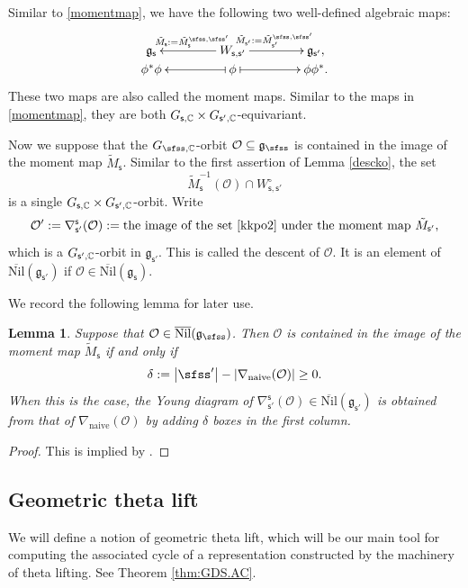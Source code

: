 \documentclass[11pt,a4paper]{amsart}
\def\abs#1{\left|{#1}\right|}
\newcommand{\CO}{{\mathcal {O}}}
\newcommand{\g}{\mathfrak g}
\def\DD{\nabla}
\newcommand{\be}{\begin {equation}}
\newcommand{\ee}{\end {equation}}
\numberwithin{equation}{section}
\newtheorem{lem}[thm]{Lemma}
\theoremstyle{remark}
\def\subset{\subseteq}
\def\Nil{\overline{\mathrm{Nil}}}
\begin{document}
Similar to \eqref{momentmap}, we have the following two well-defined algebraic maps:
   \be\label{momentmap2}
    \xymatrix@R=0em@C=4em{
      \g_\mathsf s &\ar[l]_{\tilde M_\mathsf s:=\tilde M_\mathsf s^{\sfss, \sfss'}} W_{\mathsf s, \mathsf s'}\ar[r]^{\tilde M_{\mathsf s'}:=\tilde M_{\mathsf s'}^{\sfss, \sfss'}}& \g_{\mathsf s'},\\
     \phi^* \phi & \ar@{|->}[l] \phi \ar@{|->}[r] & \phi \phi^*.
    }
  \ee
These two maps are also called the moment maps. Similar to the maps in \eqref{momentmap},   they  are both $G_{\mathsf s,\mathbb{C}}\times G_{\mathsf s', \mathbb{C}}$-equivariant.



Now we suppose that the $G_{\sfss, \C}$-orbit $\CO\subset\g_\sfss$
  is contained in the image of the moment map $\tilde M_{\mathsf s}$. Similar to
the first assertion of Lemma \ref{descko}, the set
\be\label{kkpo2}
  \tilde M_{\mathsf s}^{-1}(\CO)\cap W_{\mathsf s, \mathsf s'}^\circ
\ee
is a single $G_{\mathsf s,\mathbb{C}}\times G_{\mathsf s', \mathbb{C}}$-orbit.
Write
\[
 \CO':= \nabla^{\mathsf s}_{\mathsf s'}(\CO):=\textrm{the image of the set \eqref{kkpo2} under the moment map  $\tilde M_{\mathsf s'}$,}
\]
which is a $ G_{\mathsf s', \mathbb{C}}$-orbit in $\g_{\mathsf s'}$.
This is  called the descent of $\CO$. It is an element of  $\Nil(\g_{\mathsf s'})$ if $\CO\in \Nil(\g_{\mathsf s})$.


We record the following lemma for later use.
\begin{lem}\label{imageofmm}
Suppose that $\CO\in \Nil(\g_\sfss)$. Then  $\CO$ is contained in the image of the moment map $\tilde M_{\mathsf s}$ if and only if
\[
 \delta:=  \abs{\sfss'}-\abs{\DD_\mathrm{naive}(\CO)}\geq 0.
\]
When this is the case, the Young diagram of $\DD_{\mathsf s'}^{\mathsf s}(\CO)\in \Nil(\g_{\mathsf s'})$ is obtained from that of $\DD_\mathrm{naive}(\CO)$ by adding $\delta$ boxes in the first column.
\end{lem}
\begin{proof}
This is implied by \cite[Theorem 3.6]{DKPC}.
\end{proof}


\subsection{Geometric theta lift} \label{sec:dlift}
We will define a notion of geometric theta lift, which will be our main tool for computing the associated cycle of a representation
constructed by the machinery of theta lifting. See Theorem \ref{thm:GDS.AC}.
\end{document}
